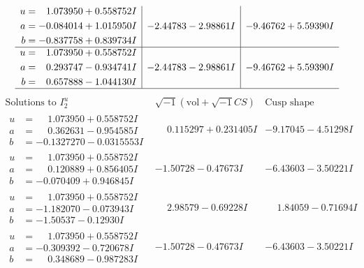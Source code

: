 \documentclass[1p]{elsarticle_modified}
\theoremstyle{definition}
\newcommand{\I}{\sqrt{-1}}
\begin{document}
$$\begin{array}{c|c|c}
\begin{aligned}
u &= \phantom{-}1.073950 + 0.558752 I \\
a &= -0.084014 + 1.015950 I \\
b &= -0.837758 + 0.839734 I\end{aligned}
 & -2.44783 - 2.98861 I & -9.46762 + 5.59390 I \\ \hline\begin{aligned}
u &= \phantom{-}1.073950 + 0.558752 I \\
a &= \phantom{-}0.293747 - 0.934741 I \\
b &= \phantom{-}0.657888 - 1.044130 I\end{aligned}
 & -2.44783 - 2.98861 I & -9.46762 + 5.59390 I\\
 \hline 
 \end{array}$$\newpage$$\begin{array}{c|c|c}  
\text{Solutions to }I^u_{2}& \I (\text{vol} + \sqrt{-1}CS) & \text{Cusp shape}\\
 \hline 
\begin{aligned}
u &= \phantom{-}1.073950 + 0.558752 I \\
a &= \phantom{-}0.362631 - 0.954585 I \\
b &= -0.1327270 - 0.0315553 I\end{aligned}
 & \phantom{-}0.115297 + 0.231405 I & -9.17045 - 4.51298 I \\ \hline\begin{aligned}
u &= \phantom{-}1.073950 + 0.558752 I \\
a &= \phantom{-}0.120889 + 0.856405 I \\
b &= -0.070409 + 0.946845 I\end{aligned}
 & -1.50728 - 0.47673 I & -6.43603 - 3.50221 I \\ \hline\begin{aligned}
u &= \phantom{-}1.073950 + 0.558752 I \\
a &= -1.182070 - 0.073943 I \\
b &= -1.50537 - 0.12930 I\end{aligned}
 & \phantom{-}2.98579 - 0.69228 I & \phantom{-}1.84059 - 0.71694 I \\ \hline\begin{aligned}
u &= \phantom{-}1.073950 + 0.558752 I \\
a &= -0.309392 - 0.720678 I \\
b &= \phantom{-}0.348689 - 0.987283 I\end{aligned}
 & -1.50728 - 0.47673 I & -6.43603 - 3.50221 I \\ \hline\begin{aligned}

\end{aligned}
\end{array}$$
\end{document}
